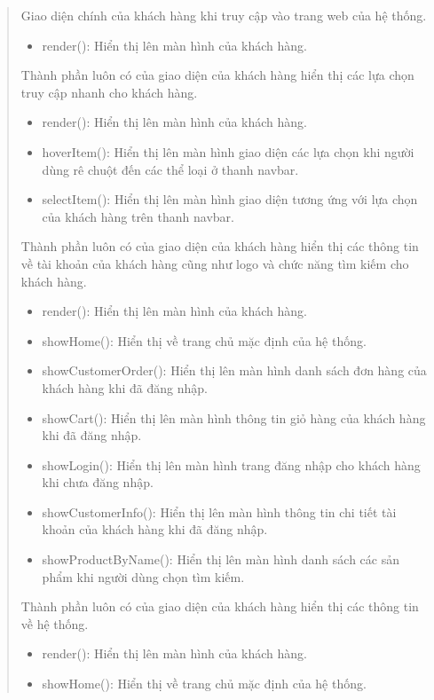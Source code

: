 \begin{quote}

	Giao diện chính của khách hàng khi truy cập vào trang web của hệ thống.
	\begin{itemize}
		\item render(): Hiển thị lên màn hình của khách hàng.
	\end{itemize}
	Thành phần luôn có của giao diện của khách hàng hiển thị các lựa chọn truy cập nhanh cho khách hàng.
	\begin{itemize}
		\item render(): Hiển thị lên màn hình của khách hàng.
		\item hoverItem(): Hiển thị lên màn hình giao diện các lựa chọn khi người dùng rê chuột đến các thể loại ở thanh navbar.
		\item selectItem(): Hiển thị lên màn hình giao diện tương ứng với lựa chọn của khách hàng trên thanh navbar.
	\end{itemize}
	Thành phần luôn có của giao diện của khách hàng hiển thị các thông tin về tài khoản của khách hàng cũng như logo và chức năng tìm kiếm cho khách hàng.
	\begin{itemize}
		\item render(): Hiển thị lên màn hình của khách hàng.
		\item showHome(): Hiển thị về trang chủ mặc định của hệ thống.
		\item showCustomerOrder(): Hiển thị lên màn hình danh sách đơn hàng của khách hàng khi đã đăng nhập.
		\item showCart(): Hiển thị lên màn hình thông tin giỏ hàng của khách hàng khi đã đăng nhập.
		\item showLogin(): Hiển thị lên màn hình trang đăng nhập cho khách hàng khi chưa đăng nhập.
		\item showCustomerInfo(): Hiển thị lên màn hình thông tin chi tiết tài khoản của khách hàng khi đã đăng nhập.
		\item showProductByName(): Hiển thị lên màn hình danh sách các sản phẩm khi người dùng chọn tìm kiếm.
	\end{itemize}
	Thành phần luôn có của giao diện của khách hàng hiển thị các thông tin về hệ thống.
	\begin{itemize}
		\item render(): Hiển thị lên màn hình của khách hàng.
		\item showHome(): Hiển thị về trang chủ mặc định của hệ thống.

\end{itemize}
\end{quote}
